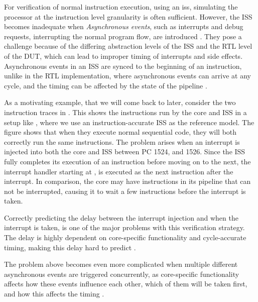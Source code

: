 For verification of normal instruction execution, using an \acrfull{iss}, simulating the processor at the instruction level granularity is often sufficient. However, the ISS becomes inadequate when \textit{Asynchronous events}, such as interrupts and debug requests, interrupting the normal program flow, are introduced \cite{taylorAdvancedRISCVVerification2023}. They pose a challenge because of the differing abstraction levels of the ISS and the RTL level of the DUT, which can lead to improper timing of interrupts and side effects. Asynchronous events in an ISS are synced to the beginning of an instruction, unlike in the RTL implementation, where asynchronous events can arrive at any cycle, and the timing can be affected by the state of the pipeline \cite{taylorAdvancedRISCVVerification2023}.

As a motivating example, that we will come back to later, consider the two instruction traces in . This shows the instructions run by the core and ISS in a setup like , where we use an instruction-accurate ISS as the reference model. The figure shows that when they execute normal sequential code, they will both correctly run the same instructions. The problem arises when an interrupt is injected into both the core and ISS between PC 1524, and 1526. Since the ISS fully completes its execution of an instruction before moving on to the next, the interrupt handler starting at , is executed as the next instruction after the interrupt. In comparison, the core may have instructions in its pipeline that can not be interrupted, causing it to wait a few instructions before the interrupt is taken. 

Correctly predicting the delay between the interrupt injection and when the interrupt is taken, is one of the major problems with this verification strategy. The delay is highly dependent on core-specific functionality and cycle-accurate timing, making this delay hard to predict \cite{taylorAdvancedRISCVVerification2023}. 

The problem above becomes even more complicated when multiple different asynchronous events are triggered concurrently, as core-specific functionality affects how these events influence each other, which of them will be taken first, and how this affects the timing \cite{}. 

